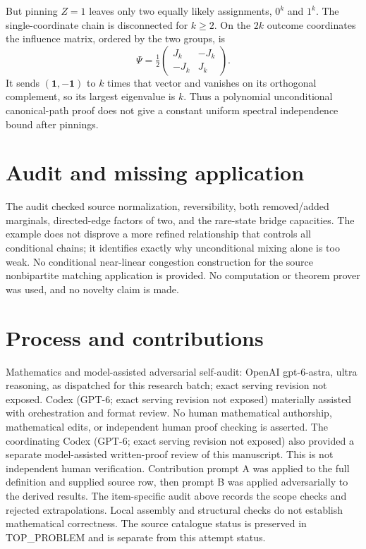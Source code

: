 \documentclass[11pt]{article}
\begin{document}
But pinning $Z=1$ leaves only two equally likely assignments,
$0^k$ and $1^k$. The single-coordinate chain is disconnected
for $k\ge2$. On the $2k$ outcome coordinates the influence
matrix, ordered by the two groups, is
\[
 \Psi=\tfrac12\begin{pmatrix}J_k&-J_k\\-J_k&J_k\end{pmatrix}.
\]
It sends $(\boldsymbol{1},-\boldsymbol{1})$ to $k$ times
that vector and vanishes on its orthogonal complement, so
its largest eigenvalue is $k$. Thus a polynomial unconditional
canonical-path proof does not give a constant uniform spectral
independence bound after pinnings.

\section{Audit and missing application}
The audit checked source normalization, reversibility, both
removed/added marginals, directed-edge factors of two, and the
rare-state bridge capacities. The example does not disprove a
more refined relationship that controls all conditional chains;
it identifies exactly why unconditional mixing alone is too weak.
No conditional near-linear congestion construction for the source
nonbipartite matching application is provided. No computation or
theorem prover was used, and no novelty claim is made.

\section{Process and contributions}
Mathematics and model-assisted adversarial self-audit: OpenAI gpt-6-astra, ultra reasoning, as dispatched for this research batch; exact serving revision not exposed. Codex (GPT-6; exact serving revision not exposed) materially assisted with orchestration and format review. No human mathematical authorship, mathematical edits, or independent human proof checking is asserted.
The coordinating Codex (GPT-6; exact serving revision not exposed) also provided a separate model-assisted written-proof review of this manuscript. This is not independent human verification.
Contribution prompt A was applied to the full definition and supplied source row, then prompt B was applied adversarially to the derived results. The item-specific audit above records the scope checks and rejected extrapolations. Local assembly and structural checks do not establish mathematical correctness. The source catalogue status is preserved in TOP\_PROBLEM and is separate from this attempt status.
\end{document}
